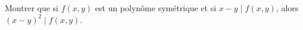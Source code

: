 Montrer que si $f(x, y)$ est un polynôme symétrique et si $x - y \mid f(x, y)$, alors $(x - y)^2 \mid f(x, y)$.
